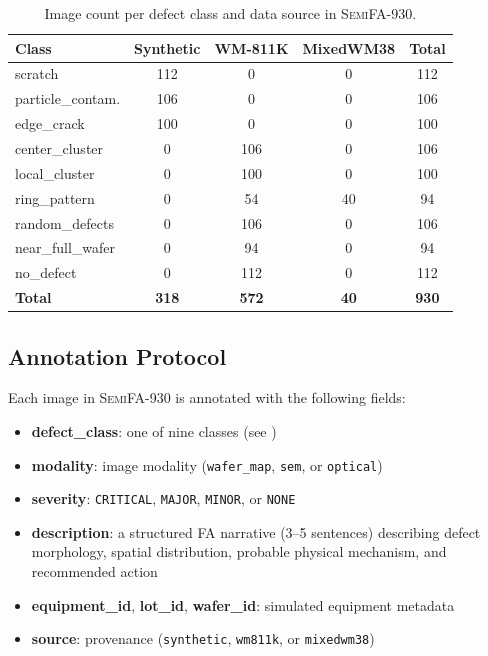 \documentclass[conference]{IEEEtran}
\newcommand{\semidataset}{\textsc{SemiFA-930}}
\begin{document}
\begin{table}[t]
    \centering
    \caption{Image count per defect class and data source in \semidataset{}.}
    \label{tab:source_counts}
    \begin{tabular}{@{}lcccc@{}}
        \toprule
        \textbf{Class} & \textbf{Synthetic} & \textbf{WM-811K} & \textbf{MixedWM38} & \textbf{Total} \\
        \midrule
        scratch              & 112 & 0   & 0   & 112 \\
        particle\_contam.     & 106 & 0   & 0   & 106 \\
        edge\_crack           & 100 & 0   & 0   & 100 \\
        center\_cluster       & 0   & 106 & 0   & 106 \\
        local\_cluster        & 0   & 100 & 0   & 100 \\
        ring\_pattern         & 0   & 54  & 40  & 94  \\
        random\_defects       & 0   & 106 & 0   & 106 \\
        near\_full\_wafer     & 0   & 94  & 0   & 94  \\
        no\_defect            & 0   & 112 & 0   & 112 \\
        \midrule
        \textbf{Total}       & \textbf{318} & \textbf{572} & \textbf{40} & \textbf{930} \\
        \bottomrule
    \end{tabular}
\end{table}

\subsection{Annotation Protocol}

Each image in \semidataset{} is annotated with the following fields:

\begin{itemize}[leftmargin=*]
    \item \textbf{defect\_class}: one of nine classes (see )
    \item \textbf{modality}: image modality (\texttt{wafer\_map}, \texttt{sem}, or \texttt{optical})
    \item \textbf{severity}: \texttt{CRITICAL}, \texttt{MAJOR}, \texttt{MINOR}, or \texttt{NONE}
    \item \textbf{description}: a structured FA narrative (3--5 sentences) describing defect morphology, spatial distribution, probable physical mechanism, and recommended action
    \item \textbf{equipment\_id}, \textbf{lot\_id}, \textbf{wafer\_id}: simulated equipment metadata
    \item \textbf{source}: provenance (\texttt{synthetic}, \texttt{wm811k}, or \texttt{mixedwm38})
\end{itemize}
\end{document}

